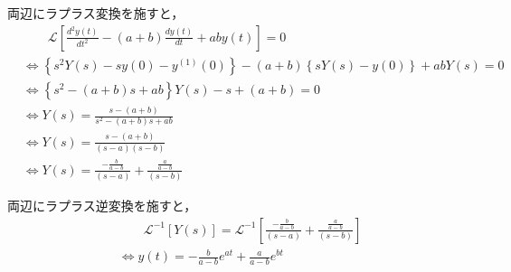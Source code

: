 \documentclass[a4paper,12pt]{article}
\begin{document}
\begin{tcolorbox}[title={[18] つぎの微分方程式をラプラス変換を用いて解け．\\
  \[
  \frac{d^2y(t)}{dt^2} -( a + b )\frac{dy(t)}{dt} + a b y(t) = 0
  \]
  
  \quad ただし，初期条件は，\(y(0)=1, y^{(1)}(0)=0\) とする．}]

  \quad 両辺にラプラス変換を施すと，
        \vspace{-3mm}
        \begin{align*}
            &\qquad \mathcal{L}\left[ \frac{d^2y(t)}{dt^2} - ( a + b )\frac{dy(t)}{dt} + a b y(t) \right] = 0 \\
            &\Leftrightarrow \left\{ s^2 Y(s) - sy(0) - y^{(1)}(0) \right\}
            - (a+b)\left\{ sY(s) - y(0) \right\}
            + abY(s) = 0  \\
            &\Leftrightarrow \left\{ s^2 - (a + b) s + ab\right\} Y(s) - s + ( a + b )= 0  \\
            &\Leftrightarrow Y(s) = \frac{s - (a + b)}{ s^2 - (a + b) s + ab }  \\
            &\Leftrightarrow Y(s) =  \frac{s - (a + b)}{ (s - a)(s - b) }  \\
            &\Leftrightarrow Y(s) =  \frac{- \frac{b}{a-b}}{ (s - a) } + \frac{ \frac{a}{a-b}}{ (s - b) }
        \end{align*}
            
        \quad 両辺にラプラス逆変換を施すと，
        \vspace{-3mm}
        \begin{align*}
        &\qquad \mathcal{L}^{-1} \left[ Y(s) \right] 
        = \mathcal{L}^{-1} \left[ \frac{- \frac{b}{a-b}}{ (s - a) } + \frac{ \frac{a}{a-b}}{ (s - b) }  \right] \\
        &\Leftrightarrow y(t) = - \frac{b}{a-b}e^{at} + \frac{a}{a-b}e^{bt}
        \end{align*}
    \end{tcolorbox}
\end{document}
